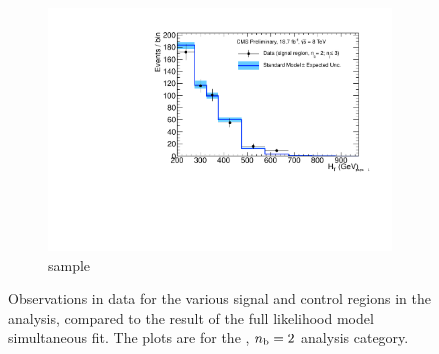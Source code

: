 \begin{figure}[h!]
\begin{subfigure}[b]{0.48\textwidth}
    \includegraphics[width=\textwidth,page=4]
    {Figs/results/v0/blueBand/bestFit_2012dev_RQcdZero_fZinvAll_2b_le3j-1h_smOnly}
    \caption{\mj sample}
  \end{subfigure}
  \caption{Observations in data for the various signal and control
  regions in the analysis, compared to the result of the full likelihood model
  simultaneous fit. The plots are for the \njlow, $n_{\text{b}} = 2$ analysis category.}
  \label{fig:blue_fits_2b_le3j}
\end{figure}

